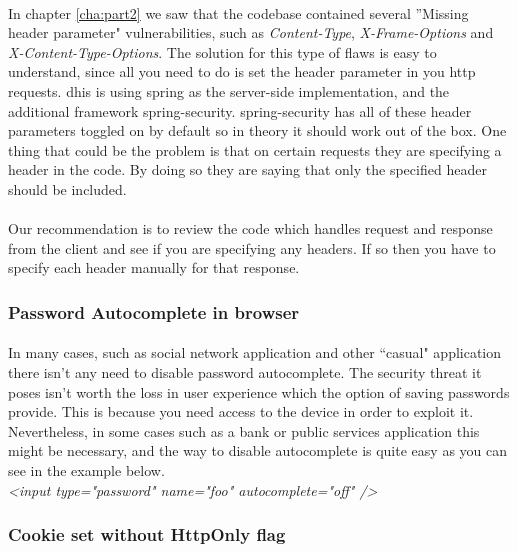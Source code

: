 \documentclass[11pt,english,a4paper]{report}
\begin{document}
\paragraph{}
In chapter \ref{cha:part2} we saw that the codebase contained several ''Missing header parameter" vulnerabilities, such as \textit{Content-Type}, \textit{X-Frame-Options} and \textit{X-Content-Type-Options}.
The solution for this type of flaws is easy to understand, since all you need to do is set the header parameter in you \gls{http} requests.
\gls{dhis} is using \gls{spring} as the server-side implementation, and the additional framework \gls{spring}-security.
\gls{spring}-security has all of these header parameters toggled on by default so in theory it should work out of the box.
One thing that could be the problem is that on certain requests they are specifying a header in the code.
By doing so they are saying that only the specified header should be included.

\paragraph{}
Our recommendation is to review the code which handles request and response from the client and see if you are specifying any headers.
If so then you have to specify each header manually for that response.\cite{spring-security}

\subsubsection{Password Autocomplete in browser}
\paragraph{}
In many cases, such as social network application and other ``casual" application there isn't any need to disable password autocomplete.
The security threat it poses isn't worth the loss in user experience which the option of saving passwords provide.
This is because you need access to the device in order to exploit it.
Nevertheless, in some cases such as a bank or public services application this might be necessary, and the way to disable autocomplete is quite easy as you can see in the example below.
\\
\textit{ \textless input type="password" name="foo" autocomplete="off" /\textgreater}

\subsubsection{Cookie set without HttpOnly flag}
\end{document}
